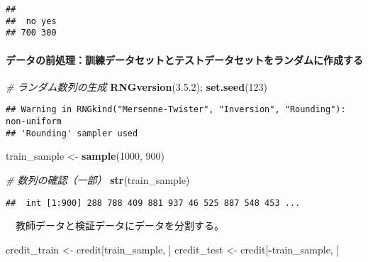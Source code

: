 \documentclass[
]{article}
\newenvironment{Shaded}{\begin{snugshade}}{\end{snugshade}}
\newcommand{\CommentTok}[1]{\textcolor[rgb]{0.56,0.35,0.01}{\textit{#1}}}
\newcommand{\DecValTok}[1]{\textcolor[rgb]{0.00,0.00,0.81}{#1}}
\newcommand{\FunctionTok}[1]{\textcolor[rgb]{0.13,0.29,0.53}{\textbf{#1}}}
\newcommand{\NormalTok}[1]{#1}
\newcommand{\OtherTok}[1]{\textcolor[rgb]{0.56,0.35,0.01}{#1}}
\newcommand{\SpecialCharTok}[1]{\textcolor[rgb]{0.81,0.36,0.00}{\textbf{#1}}}
\newcommand{\StringTok}[1]{\textcolor[rgb]{0.31,0.60,0.02}{#1}}
\begin{document}
\begin{verbatim}
## 
##  no yes 
## 700 300
\end{verbatim}

\paragraph{データの前処理：訓練データセットとテストデータセットをランダムに作成する}\label{ux30c7ux30fcux30bfux306eux524dux51e6ux7406ux8a13ux7df4ux30c7ux30fcux30bfux30bbux30c3ux30c8ux3068ux30c6ux30b9ux30c8ux30c7ux30fcux30bfux30bbux30c3ux30c8ux3092ux30e9ux30f3ux30c0ux30e0ux306bux4f5cux6210ux3059ux308b}

\begin{Shaded}
\begin{Highlighting}[]
\CommentTok{\# ランダム数列の生成}
\FunctionTok{RNGversion}\NormalTok{(}\StringTok{\textquotesingle{}3.5.2\textquotesingle{}}\NormalTok{); }\FunctionTok{set.seed}\NormalTok{(}\DecValTok{123}\NormalTok{)}
\end{Highlighting}
\end{Shaded}

\begin{verbatim}
## Warning in RNGkind("Mersenne-Twister", "Inversion", "Rounding"): non-uniform
## 'Rounding' sampler used
\end{verbatim}

\begin{Shaded}
\begin{Highlighting}[]
\NormalTok{train\_sample }\OtherTok{\textless{}{-}} \FunctionTok{sample}\NormalTok{(}\DecValTok{1000}\NormalTok{, }\DecValTok{900}\NormalTok{)}

\CommentTok{\# 数列の確認（一部）}
\FunctionTok{str}\NormalTok{(train\_sample)}
\end{Highlighting}
\end{Shaded}

\begin{verbatim}
##  int [1:900] 288 788 409 881 937 46 525 887 548 453 ...
\end{verbatim}

　教師データと検証データにデータを分割する。

\begin{Shaded}
\begin{Highlighting}[]
\NormalTok{credit\_train }\OtherTok{\textless{}{-}}\NormalTok{ credit[train\_sample, ]}
\NormalTok{credit\_test }\OtherTok{\textless{}{-}}\NormalTok{ credit[}\SpecialCharTok{{-}}\NormalTok{train\_sample, ]}
\end{Highlighting}
\end{Shaded}
\end{document}

